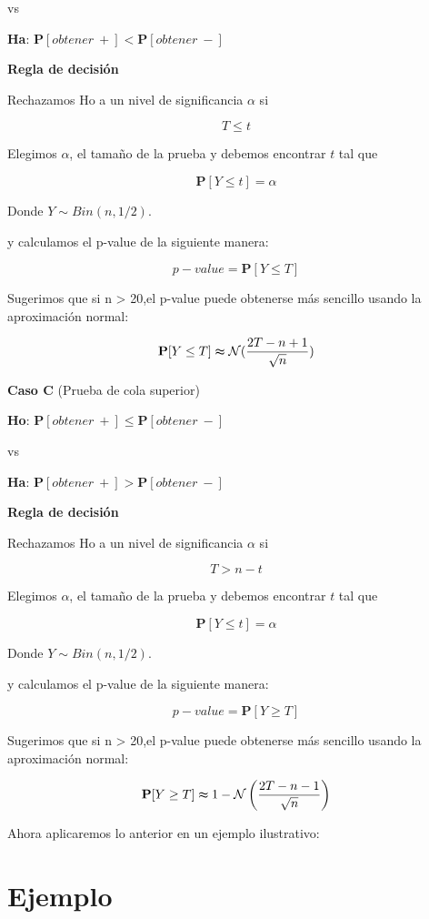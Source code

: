 \documentclass[a4paper,oneside,openany]{book}
\begin{document}
vs

\textbf{Ha}: \(\mathbf{P}[obtener\ +] < \mathbf{P}[obtener\ -]\)

\textbf{Regla de decisión}

Rechazamos Ho a un nivel de significancia \(\alpha\) si

\[T \leq t\]

Elegimos \(\alpha\), el tamaño de la prueba y debemos encontrar \(t\)
tal que

\[\mathbf{P}[Y \leq t]=\alpha\]

Donde \(Y \sim Bin (n,1/2)\).

y calculamos el p-value de la siguiente manera:

\[p-value=\mathbf{P}[Y\leq T]\]

Sugerimos que si n \textgreater{} 20,el p-value puede obtenerse más
sencillo usando la aproximación normal:

\[\mathbf{P}[Y\leq T] \thickapprox  \mathcal{N} (\frac{2T-n+1}{\sqrt{n}})\]

\textbf{Caso C} (Prueba de cola superior)

\textbf{Ho}: \(\mathbf{P}[obtener\ +] \leq \mathbf{P}[obtener\ -]\)

vs

\textbf{Ha}: \(\mathbf{P}[obtener\ +] > \mathbf{P}[obtener\ -]\)

\textbf{Regla de decisión}

Rechazamos Ho a un nivel de significancia \(\alpha\) si

\[T > n-t \]

Elegimos \(\alpha\), el tamaño de la prueba y debemos encontrar \(t\)
tal que

\[\mathbf{P}[Y \leq t]=\alpha\]

Donde \(Y \sim Bin (n,1/2)\).

y calculamos el p-value de la siguiente manera:

\[p-value=\mathbf{P}[Y\geq T]\]

Sugerimos que si n \textgreater{} 20,el p-value puede obtenerse más
sencillo usando la aproximación normal:

\[\mathbf{P}[Y\geq T] \thickapprox 1- \mathcal{N} \left(\frac{2T-n-1}{\sqrt{n}}\right)\]

Ahora aplicaremos lo anterior en un ejemplo ilustrativo:

\section{Ejemplo}\label{ejemplo-4}
\end{document}

